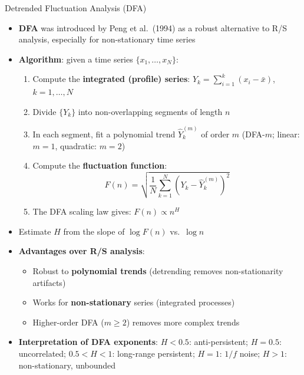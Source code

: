 \documentclass[9pt, aspectratio=169, t]{beamer}
\theoremstyle{definition}
\begin{document}
\begin{frame}{Detrended Fluctuation Analysis (DFA)}
    \begin{itemize}
        \item \textbf{DFA} was introduced by Peng et al.\ (1994) as a robust alternative to R/S analysis, especially for non-stationary time series
        \item \textbf{Algorithm}: given a time series $\{x_1, \ldots, x_N\}$:
        \begin{enumerate}
            \item Compute the \textbf{integrated (profile) series}: $Y_k = \sum_{i=1}^k (x_i - \bar{x})$, \quad $k = 1, \ldots, N$
            \item Divide $\{Y_k\}$ into non-overlapping segments of length $n$
            \item In each segment, fit a polynomial trend $\hat{Y}_k^{(m)}$ of order $m$ (DFA-$m$; linear: $m=1$, quadratic: $m=2$)
            \item Compute the \textbf{fluctuation function}:
            \[
                F(n) = \sqrt{\frac{1}{N}\sum_{k=1}^{N} \left(Y_k - \hat{Y}_k^{(m)}\right)^2}
            \]
            \item The DFA scaling law gives: $F(n) \propto n^H$
        \end{enumerate}
        \item Estimate $H$ from the slope of $\log F(n)$ vs.\ $\log n$
        \item \textbf{Advantages over R/S analysis}:
        \begin{itemize}
            \item Robust to \textbf{polynomial trends} (detrending removes non-stationarity artifacts)
            \item Works for \textbf{non-stationary} series (integrated processes)
            \item Higher-order DFA ($m \geq 2$) removes more complex trends
        \end{itemize}
        \item \textbf{Interpretation of DFA exponents}:
        $H < 0.5$: anti-persistent; \enspace $H = 0.5$: uncorrelated; \enspace $0.5 < H < 1$: long-range persistent; \enspace $H = 1$: $1/f$ noise; \enspace $H > 1$: non-stationary, unbounded
    \end{itemize}
\end{frame}

\end{document}
